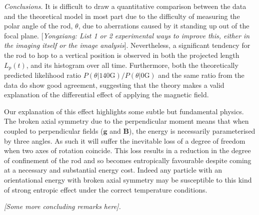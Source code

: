 \documentclass[aps,prl,twocolumn,superscriptaddress]{revtex4-1}
\newcommand{\vcrm}[1]{\mathbf{#1}}
\newcommand{\hvcrm}[1]{\mathbf{\hat{#1}}}
\newcommand{\vc}[1]{\boldsymbol{#1}}
\newcommand{\hvc}[1]{\boldsymbol{\hat{#1}}}
\newcommand{\kk}{\mathrm{k}_B}
\begin{document}
\emph{Conclusions.} It is difficult to draw a quantitative comparison between the data and the theoretical model in most part due to the difficulty of measuring the polar angle of the rod, $\theta$, due to aberrations caused by it standing up out of the focal plane. [\emph{Yongxiang: List 1 or 2 experimental ways to improve this, either in the imaging itself or the image analysis}]. Nevertheless, a significant tendency for the rod to hop to a vertical position is observed in both the projected length $L_p(t)$, and its histogram over all time. Furthermore, both the theoretically predicted likelihood ratio $P(\theta|140 \text{G})/P(\theta|0 \text{G})$ and the same ratio from the data do show good agreement, suggesting that the theory makes a valid explanation of the differential effect of applying the magnetic field. 

Our explanation of this effect highlights some subtle but fundamental physics. The broken axial symmetry due to the perpendicular moment means that when coupled to perpendicular fields ($\vcrm{g}$ and $\vcrm{B}$), the energy is necessarily parameterised by three angles. As such it will suffer the inevitable loss of a degree of freedom when two axes of rotation coincide. This loss results in a reduction in the degree of confinement of the rod and so becomes entropically favourable despite coming at a necessary and substantial energy cost.  Indeed any particle with an orientational energy with broken axial symmetry may be susceptible to this kind of strong entropic effect under the correct temperature conditions.  

\emph{[Some more concluding remarks here].}





\end{document}
